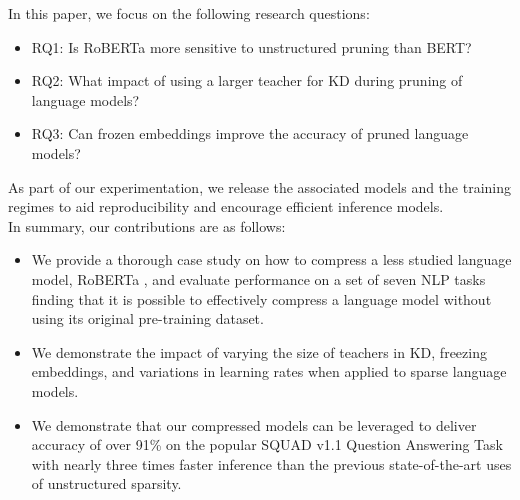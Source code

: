 \documentclass[11pt]{article}
\begin{document}
In this paper, we focus on the following research questions: 
\begin{itemize}
    \item RQ1: Is RoBERTa more sensitive to unstructured pruning than BERT?
    \item RQ2: What impact of using a larger teacher for KD during pruning of language models? 
    \item RQ3: Can frozen embeddings improve the accuracy of pruned language models?
\end{itemize}As part of our experimentation, we release the associated models and the training regimes to aid reproducibility and encourage efficient inference models. \\
In summary, our contributions are as follows:
\begin{itemize}
    \item We provide a thorough case study on how to compress a less studied language model, RoBERTa \cite{Liu2019RoBERTaAR}, and evaluate performance on a set of seven NLP tasks finding that it is possible to effectively compress a language model without using its original pre-training dataset.
    \item We demonstrate the impact of varying the size of teachers in KD, freezing embeddings, and variations in learning rates when applied to sparse language models.
    \item We demonstrate that our compressed models can be leveraged to deliver accuracy of over 91\% on the popular SQUAD v1.1 \cite{Rajpurkar2016SQuAD10} Question Answering Task with nearly three times faster inference than the previous state-of-the-art uses of unstructured sparsity.
\end{itemize} 
\end{document}
